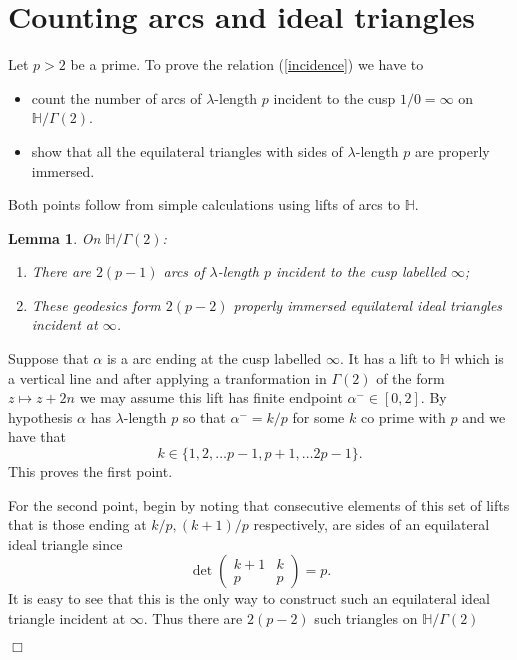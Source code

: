 \documentclass[12pt]{amsart}
\theoremstyle{plain}
\newtheorem{lemma}{Lemma}[section]
\theoremstyle{definition}
\def\HH{\mathbb{H}}
\def\xx{\HH/g2}
\def\g2{\Gamma(2)}
\def\xx{\HH/\g2}
\begin{document}
\section{Counting arcs and ideal triangles}
\label{counting arcs etc}

Let $p> 2$ be a prime. To prove the relation (\ref{incidence})
we have to  
\begin{itemize}
\item count the number 
of arcs of $\lambda$-length $p$
incident to the cusp $1/0 = \infty$ on $\xx$.
\item 
show that all the equilateral triangles with sides of $\lambda$-length $p$ are properly immersed.
\end{itemize}

Both points follow from simple calculations using lifts of
arcs to $\HH$.


\begin{lemma}\label{counting}
On $\xx$:
\begin{enumerate}
\item There are $2(p-1)$ arcs of $\lambda$-length $p$ incident to the cusp labelled  $\infty$;
\item These geodesics form $2(p-2)$ properly  immersed equilateral ideal triangles incident at $\infty$.
\end{enumerate}
\end{lemma}

\proof Suppose that $\alpha$ is a arc ending at the cusp labelled 
$\infty$.
It has a lift to $\HH$ which is a vertical line and after 
applying a tranformation in $\Gamma(2)$ of the 
form $z \mapsto z + 2n$ we may assume this lift has finite endpoint $\alpha^- \in [0,2]$.
By hypothesis $\alpha$ has  $\lambda$-length $p$ 
so that $\alpha^- = k/p$ for some $k$ co prime with $p$
and we have that
$$ k \in \{1,2,\ldots p-1, p+ 1, \ldots 2p -1 \}.$$
This proves the first point.

For the second point, begin by  noting that consecutive elements of this set of lifts
that is those ending at $k/p, (k+1)/p$ respectively, are sides of
an equilateral ideal triangle since
$$\det \begin{pmatrix}
k + 1 & k \\ p & p 
\end{pmatrix} = p.$$
It is easy to see that this is the only way to construct such
an  equilateral ideal triangle incident at $\infty$.
Thus there are $2(p-2)$ such triangles on $\xx$

\hfill $\Box$
\end{document}
